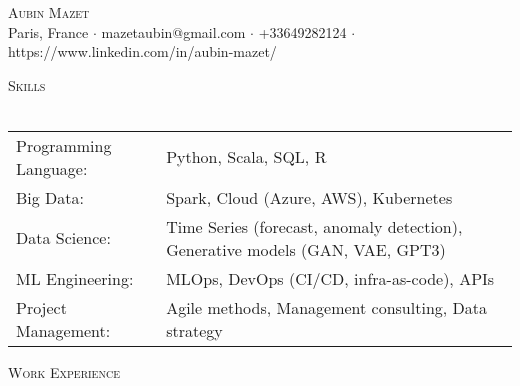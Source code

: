 \documentclass[a4paper]{article}
\newcommand{\lineunder} {
    \vspace*{-8pt} \\
    \hspace*{-18pt} \hrulefill \\
}
\newcommand{\header} [1] {
    {\hspace*{-18pt}\vspace*{6pt} \textsc{#1}}
    \vspace*{-6pt} \lineunder
}
\begin{document}
\vspace*{-40pt}

    

\vspace*{-10pt}
\begin{center}
	{\Huge \scshape {Aubin Mazet}}\\
	Paris, France $\cdot$ mazetaubin@gmail.com $\cdot$ +33649282124 $\cdot$ https://www.linkedin.com/in/aubin-mazet/\\
\end{center}

\header{Skills}
\begin{tabular}{ l l }
	Programming Language:         & Python, Scala, SQL, R                                                                        \\
	Big Data:                     & Spark, Cloud (Azure, AWS), Kubernetes                                                \\
	Data Science:                 & Time Series (forecast, anomaly detection), Generative models (GAN, VAE, GPT3)   \\
	ML Engineering:               & MLOps, DevOps (CI/CD, infra-as-code), APIs \\
	Project Management:           & Agile methods, Management consulting, Data strategy                                              \\
\end{tabular}
\vspace{2mm}

\header{Work Experience}
\vspace{1mm}
\end{document}
